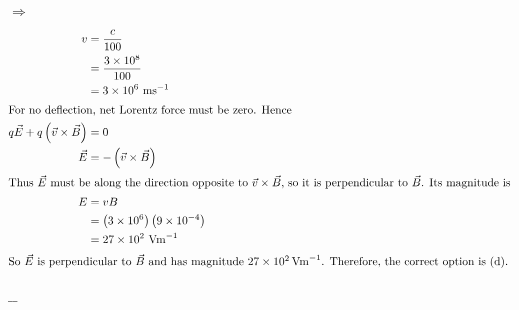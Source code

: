 \documentclass[preview, border={10mm, 5mm, 10mm, 10mm}]{standalone}
\title{\textsc{}}
\newenvironment{solution}{\par\noindent\color{red!80!black}$\Rightarrow$\enspace\ignorespaces}{\par}
\begin{document}
\begin{solution}
\begin{align*}
v &= \frac{c}{100} \\
  &= \frac{3 \times 10^8}{100} \\
  &= 3 \times 10^6 \ \mathrm{m s}^{-1} \\
\intertext{For no deflection, net Lorentz force must be zero. Hence}
q\vec{E} + q\left( \vec{v} \times \vec{B} \right) &= 0 \\
\vec{E} &= -\left( \vec{v} \times \vec{B} \right) \\
\intertext{Thus $\vec{E}$ must be along the direction opposite to $\vec{v} \times \vec{B}$, so it is perpendicular to $\vec{B}$. Its magnitude is}
E &= v B \\
  &= \left( 3 \times 10^6 \right)\left( 9 \times 10^{-4} \right) \\
  &= 27 \times 10^2 \ \mathrm{V m}^{-1} \\
\intertext{So $\vec{E}$ is perpendicular to $\vec{B}$ and has magnitude $27 \times 10^2\,\mathrm{V m}^{-1}$. Therefore, the correct option is (d).}
\end{align*}
\end{solution}
\hfill $\_\_$
\end{document}
